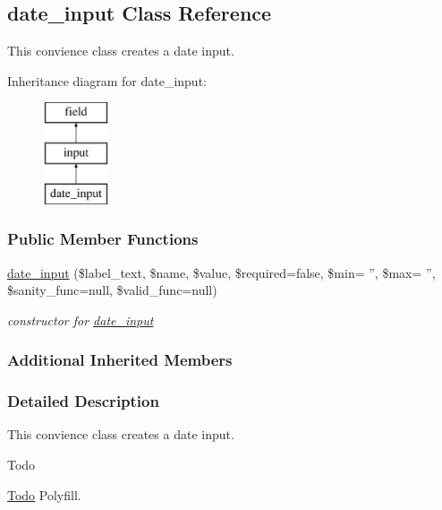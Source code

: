 \hypertarget{classdate__input}{\subsection{date\-\_\-input Class Reference}
\label{classdate__input}
}


This convience class creates a date input.  


Inheritance diagram for date\-\_\-input\-:\begin{figure}[H]
\begin{center}
\leavevmode
\includegraphics[height=3.000000cm]{classdate__input}
\end{center}
\end{figure}
\subsubsection*{Public Member Functions}
\begin{DoxyCompactItemize}
\item 
\hyperlink{classdate__input_a492b84dcbc8228427c6e5b0c415ad7ed}{date\-\_\-input} (\$label\-\_\-text, \$name, \$value, \$required=false, \$min= '', \$max= '', \$sanity\-\_\-func=null, \$valid\-\_\-func=null)
\begin{DoxyCompactList}\small\item\em constructor for \hyperlink{classdate__input}{date\-\_\-input} \end{DoxyCompactList}\end{DoxyCompactItemize}
\subsubsection*{Additional Inherited Members}


\subsubsection{Detailed Description}
This convience class creates a date input. 

\begin{DoxyRefDesc}{Todo}
\item[\hyperlink{todo__todo000005}{Todo}]Polyfill. \end{DoxyRefDesc}


